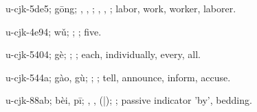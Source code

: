 \begin{multicols}{2}
{\cjkgGlue{}u-cjk-5de5; gōng; \cjkgGlue{}, \cjkgGlue{}, \cjkgGlue{}; \cjkgGlue{}, \cjkgGlue{}, \cjkgGlue{}; labor, work, worker, laborer.

\cjkgGlue{}u-cjk-4e94; wǔ; \cjkgGlue{}\cjkgGlue{}\cjkgGlue{}; \cjkgGlue{}; five.

\cjkgGlue{}u-cjk-5404; gè; \cjkgGlue{}; \cjkgGlue{}; each, individually, every, all.

\cjkgGlue{}u-cjk-544a; gào, gù; \cjkgGlue{}\cjkgGlue{}\cjkgGlue{}; \cjkgGlue{}; tell, announce, inform, accuse.

\cjkgGlue{}u-cjk-88ab; bèi, pī; \cjkgGlue{}\cjkgGlue{}\cjkgGlue{}, \cjkgGlue{}\cjkgGlue{}\cjkgGlue{}, \cjkgGlue{}\cjkgGlue{}(\cjkgGlue{}|\cjkgGlue{}); \cjkgGlue{}; passive indicator 'by', bedding.

}
\end{multicols}
